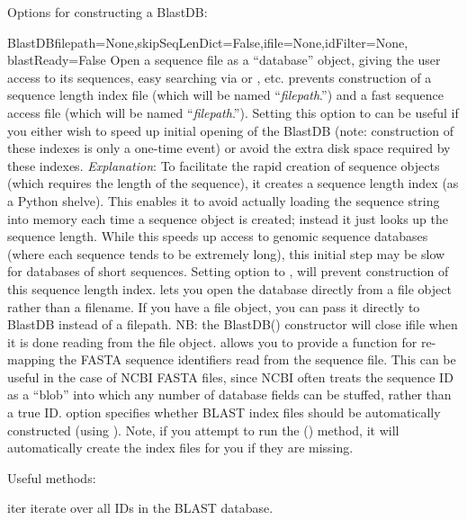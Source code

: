\documentclass{howto}
\begin{document}
Options for constructing a BlastDB:

\begin{funcdesc}{BlastDB}{filepath=None,skipSeqLenDict=False,ifile=None,idFilter=None,
                 blastReady=False}
  Open a sequence file as a ``database'' object, giving the user access to its sequences,
  easy searching via  or , etc.
   prevents construction of a sequence length index file 
  (which will be named ``{\em filepath}.'') and a fast
  sequence access file (which will be named ``{\em filepath}.'').
  Setting this option to  can be useful if you either wish to
  speed up initial opening of the BlastDB (note: construction of these indexes is
  only a one-time event) or avoid the extra disk space required by these indexes.
  {\em Explanation}: To facilitate the rapid creation of sequence objects (which requires the length of the sequence), it creates a sequence length index (as a Python shelve).  This enables it to avoid actually loading the sequence string into memory each time a sequence object is created; instead it just looks up the sequence length.  While this speeds up access to genomic sequence databases (where each sequence tends to be extremely long), this initial step may be slow for databases of short sequences.  Setting  option to , will prevent construction of this sequence length index.
   lets you open the database directly from a file object rather
  than a filename.  If you have a file object, you can pass it directly to BlastDB instead of a filepath.  NB: the BlastDB() constructor will close ifile when it is done reading from the file object.
   allows you to provide a function for re-mapping the FASTA sequence
  identifiers read from the sequence file.  This can be useful in the case of
  NCBI FASTA files, since NCBI often treats the sequence ID as a ``blob'' into
  which any number of database fields can be stuffed, rather than a true ID.
   option specifies whether BLAST index files should be automatically
  constructed (using ).  Note, if you attempt to run the ()
  method, it will automatically create the index files for you if they are missing.
\end{funcdesc}

Useful methods:

\begin{funcdesc}{iter}{}
  iterate over all IDs in the BLAST database.
\end{funcdesc}
\end{document}
